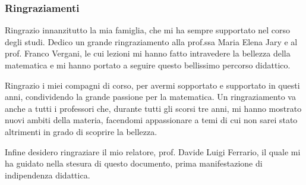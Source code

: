 \begin{center}
 \subsubsection*{Ringraziamenti}
\end{center}
Ringrazio innanzitutto la mia famiglia, che mi ha sempre supportato nel corso degli studi.
Dedico un grande ringraziamento alla prof.ssa Maria Elena Jary e al prof. Franco Vergani, le cui lezioni mi hanno fatto intravedere la bellezza della matematica e mi hanno portato a seguire questo bellissimo percorso didattico.

Ringrazio i miei compagni di corso, per avermi sopportato e supportato in questi anni, condividendo la grande passione per la matematica.
Un ringraziamento va anche a tutti i professori che, durante tutti gli scorsi tre anni, mi hanno mostrato nuovi ambiti della materia, facendomi appassionare a temi di cui non sarei stato altrimenti in grado di scoprire la bellezza.

Infine desidero ringraziare il mio relatore, prof. Davide Luigi Ferrario, il quale mi ha guidato nella stesura di questo documento, prima manifestazione di indipendenza didattica.
